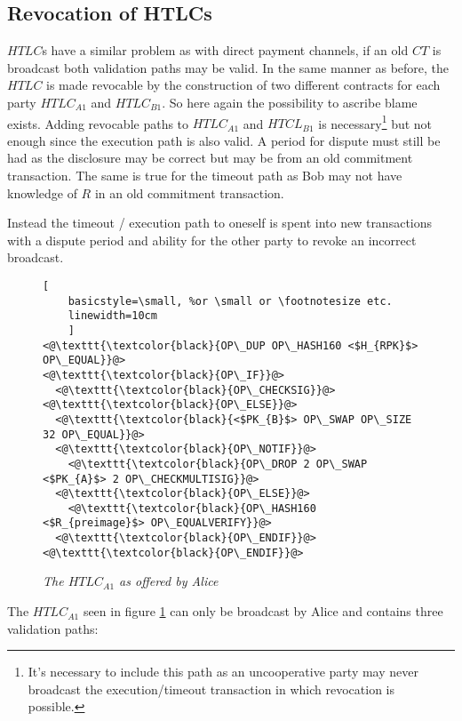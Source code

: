 \subsection{Revocation of HTLCs}

$HTLC$s have a similar problem as with direct payment channels, if an old $CT$ is broadcast both validation paths may be valid. In the same manner as before, the $HTLC$ is made revocable by the construction of two different contracts for each party $HTLC_{A1}$ and $HTLC_{B1}$. So here again the possibility to ascribe blame exists. Adding revocable paths to $HTLC_{A1}$ and $HTCL_{B1}$ is necessary\footnote{It's necessary to include this path as an uncooperative party may never broadcast the execution/timeout transaction in which revocation is possible.} but not enough since the execution path is also valid. A period for dispute must still be had as the disclosure may be correct but may be from an old commitment transaction. The same is true for the timeout path as Bob may not have knowledge of $R$ in an old commitment transaction.   

Instead the timeout / execution path to oneself is spent into new transactions with a dispute period and ability for the other party to revoke an incorrect broadcast. 

\begin{figure}[hbt!]

	\centering

	\begin{lstlisting}[
	basicstyle=\small, %or \small or \footnotesize etc.
	linewidth=10cm
	]
<@\texttt{\textcolor{black}{OP\_DUP OP\_HASH160 <$H_{RPK}$> OP\_EQUAL}}@>
<@\texttt{\textcolor{black}{OP\_IF}}@>
  <@\texttt{\textcolor{black}{OP\_CHECKSIG}}@>
<@\texttt{\textcolor{black}{OP\_ELSE}}@>
  <@\texttt{\textcolor{black}{<$PK_{B}$> OP\_SWAP OP\_SIZE 32 OP\_EQUAL}}@>
  <@\texttt{\textcolor{black}{OP\_NOTIF}}@>
    <@\texttt{\textcolor{black}{OP\_DROP 2 OP\_SWAP <$PK_{A}$> 2 OP\_CHECKMULTISIG}}@>  
  <@\texttt{\textcolor{black}{OP\_ELSE}}@> 
    <@\texttt{\textcolor{black}{OP\_HASH160 <$R_{preimage}$> OP\_EQUALVERIFY}}@> 
  <@\texttt{\textcolor{black}{OP\_ENDIF}}@>
<@\texttt{\textcolor{black}{OP\_ENDIF}}@>
	\end{lstlisting}
	
	\caption{\textit{ The $HTLC_{A1}$ as offered by Alice
	}}
	\label{fig:alice:HTLC}
\end{figure}

The $HTLC_{A1}$ seen in figure \ref{fig:alice:HTLC} can only be broadcast by Alice and contains three validation paths:


